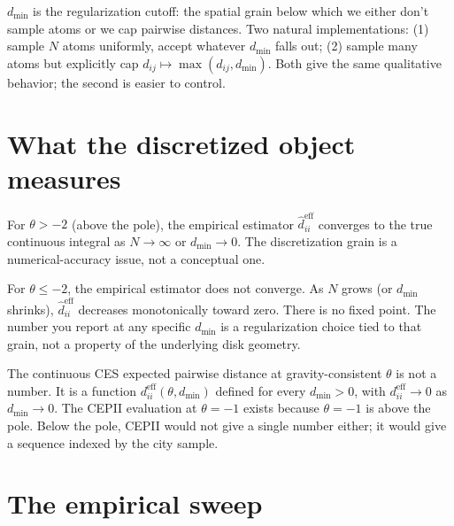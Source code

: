 \documentclass[11pt,letterpaper,oneside]{book}
\theoremstyle{definition}
\theoremstyle{remark}
\newcommand{\eff}{\mathrm{eff}}
\begin{document}
\begin{notation}
$d_{\min}$ is the regularization cutoff: the spatial grain below which
we either don't sample atoms or we cap pairwise distances. Two natural
implementations: (1) sample $N$ atoms uniformly, accept whatever
$d_{\min}$ falls out; (2) sample many atoms but explicitly cap
$d_{ij} \mapsto \max(d_{ij}, d_{\min})$. Both give the same qualitative
behavior; the second is easier to control.
\end{notation}

\section{What the discretized object measures}

For $\theta > -2$ (above the pole), the empirical estimator
$\hat{d}_{ii}^{\eff}$ converges to the true continuous integral as
$N \to \infty$ or $d_{\min} \to 0$. The discretization grain is a
numerical-accuracy issue, not a conceptual one.

For $\theta \leq -2$, the empirical estimator does not converge. As
$N$ grows (or $d_{\min}$ shrinks), $\hat{d}_{ii}^{\eff}$ decreases
monotonically toward zero. There is no fixed point. The number you
report at any specific $d_{\min}$ is a regularization choice tied to
that grain, not a property of the underlying disk geometry.

\begin{insight}
The continuous CES expected pairwise distance at gravity-consistent
$\theta$ is not a number. It is a function $d_{ii}^{\eff}(\theta, d_{\min})$
defined for every $d_{\min} > 0$, with $d_{ii}^{\eff} \to 0$ as
$d_{\min} \to 0$. The CEPII evaluation at $\theta = -1$ exists because
$\theta = -1$ is above the pole. Below the pole, CEPII would not give a
single number either; it would give a sequence indexed by the city
sample.
\end{insight}

\section{The empirical sweep}
\end{document}
